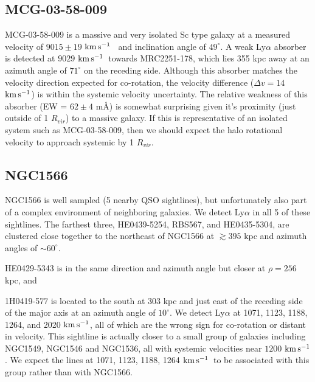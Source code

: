 \documentclass[iop]{emulateapj-rtx4}
\newcommand{\kms}{$\rm km\, s^{-1}$}
\begin{document}
\subsection{MCG-03-58-009}
MCG-03-58-009 is a massive and very isolated Sc type galaxy at a measured velocity of $9015 \pm 19$ \kms~ and inclination angle of $49^{\circ}$. A weak Ly$\alpha$ absorber is detected at $9029$ \kms~towards MRC2251-178, which lies 355 kpc away at an azimuth angle of $71^{\circ}$ on the receding side. Although this absorber matches the velocity direction expected for co-rotation, the velocity difference ($\Delta v = 14$ \kms) is within the systemic velocity uncertainty. The relative weakness of this absorber (EW = $62 \pm 4$ m\AA) is somewhat surprising given it's proximity (just outside of 1 $R_{vir}$) to a massive galaxy. If this is representative of an isolated system such as MCG-03-58-009, then we should expect the halo rotational velocity to approach systemic by 1 $R_{vir}$.

%



\subsection{NGC1566}
NGC1566 is well sampled (5 nearby QSO sightlines), but unfortunately also part of a complex environment of neighboring galaxies. We detect Ly$\alpha$ in all 5 of these sightlines. The farthest three, HE0439-5254, RBS567, and HE0435-5304, are clustered close together to the northeast of NGC1566 at $\gtrsim 395$ kpc and azimuth angles of $\sim 60^{\circ}$. 


HE0429-5343 is in the same direction and azimuth angle but closer at $\rho = 256$ kpc, and 

1H0419-577 is located to the south at 303 kpc and just east of the receding side of the major axis at an azimuth angle of $10^{\circ}$. We detect Ly$\alpha$ at 1071, 1123, 1188, 1264, and 2020 \kms, all of which are the wrong sign for co-rotation or distant in velocity. This sightline is actually closer to a small group of galaxies including NGC1549, NGC1546 and NGC1536, all with systemic velocities near $1200$ \kms. We expect the lines at 1071, 1123, 1188, 1264 \kms~to be associated with this group rather than with NGC1566.
\end{document}
